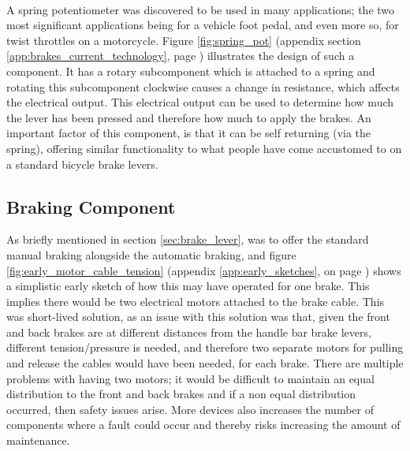 \documentclass[a4paper]{report}
\begin{document}
\paragraph{}A spring potentiometer was discovered to be used in many applications; the two most significant applications being for a vehicle foot pedal, and even more so, for twist throttles on a motorcycle. Figure \ref{fig:spring_pot} (appendix section \ref{app:brakes_current_technology}, page \pageref{fig:spring_pot}) illustrates the design of such a component. It has a rotary subcomponent which is attached to a spring and rotating this subcomponent clockwise causes a change in resistance, which affects the electrical output. This electrical output can be used to determine how much the lever has been pressed and therefore how much to apply the brakes. An important factor of this component, is that it can be self returning (via the spring), offering similar functionality to what people have come accustomed to on a standard bicycle brake levers.


\subsection{Braking Component}
\label{sec:braking_component}

As briefly mentioned in section \ref{sec:brake_lever}, was to offer the standard manual braking alongside the automatic braking, and figure \ref{fig:early_motor_cable_tension} (appendix \ref{app:early_sketches}, on page \pageref{fig:early_motor_cable_tension}) shows a simplistic early sketch of how this may have operated for one brake. This implies there would be two electrical motors attached to the brake cable. This was short-lived solution, as an issue with this solution was that, given the front and back brakes are at different distances from the handle bar brake levers, different tension/pressure is needed, and therefore two separate motors for pulling and release the cables would have been needed, for each brake. There are multiple problems with having two motors; it would be difficult to maintain an equal distribution to the front and back brakes and if a non equal distribution occurred, then safety issues arise. More devices also increases the number of components where a fault could occur and thereby risks increasing the amount of maintenance.  
\end{document}
